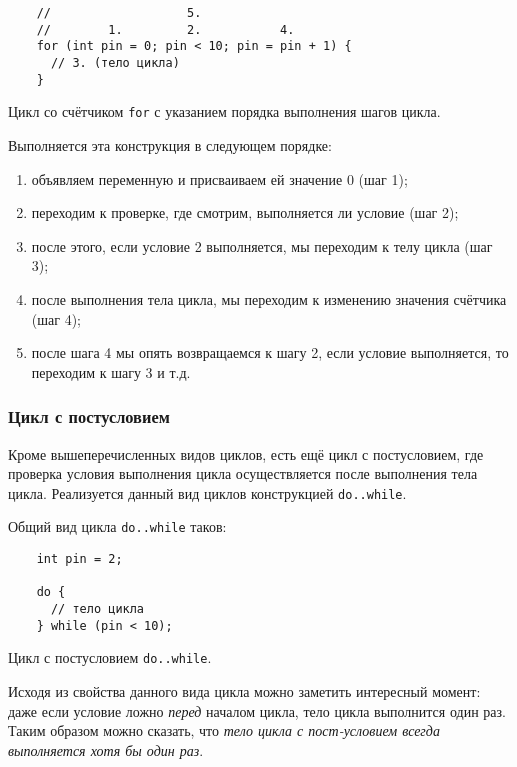 \documentclass[../sparc.tex]{subfiles}
\begin{document}
\begin{listing}[ht]
  \begin{verbatim}
    //                   5.
    //        1.         2.           4.
    for (int pin = 0; pin < 10; pin = pin + 1) {
      // 3. (тело цикла)
    }
  \end{verbatim}
  \label{listing:dialogues-with-computer-for}
  \caption{Цикл со счётчиком \texttt{for} с указанием порядка выполнения шагов
    цикла.}
\end{listing}

Выполняется эта конструкция в следующем порядке:
\begin{enumerate}
\item объявляем переменную и присваиваем ей значение 0 (шаг 1);
\item переходим к проверке, где смотрим, выполняется ли условие (шаг 2);
\item после этого, если условие 2 выполняется, мы переходим к телу цикла (шаг 3);
\item после выполнения тела цикла, мы переходим к изменению значения счётчика (шаг 4);
\item после шага 4 мы опять возвращаемся к шагу 2, если условие выполняется, то
  переходим к шагу 3 и т.д.
\end{enumerate}

\subsubsection{Цикл с постусловием}

Кроме вышеперечисленных видов циклов, есть ещё цикл с постусловием, где
проверка условия выполнения цикла осуществляется после выполнения тела цикла.
Реализуется данный вид циклов конструкцией \texttt{do..while}.

Общий вид цикла \texttt{do..while} таков:

\begin{listing}[ht]
  \begin{verbatim}
    int pin = 2;

    do {
      // тело цикла
    } while (pin < 10);
  \end{verbatim}
  \label{listing:dialogues-with-computer-do-while}
  \caption{Цикл с постусловием \texttt{do..while}.}
\end{listing}

Исходя из свойства данного вида цикла можно заметить интересный момент: даже
если условие ложно \emph{перед} началом цикла, тело цикла выполнится один раз.
Таким образом можно сказать, что \emph{тело цикла с пост-условием всегда
выполняется хотя бы один раз}.
\end{document}
